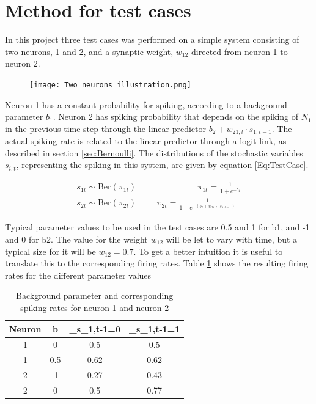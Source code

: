 \section{Method for test cases}
\label{Method}

In this project three test cases was performed on a simple system consisting of two neurons, 1 and 2, and a synaptic weight, $w_{12}$ directed from neuron 1 to neuron 2.

\begin{figure}[h]
    \centering
    \texttt{[image: Two\_neurons\_illustration.png]}
\end{figure}

Neuron 1 has a constant probability for spiking, according to a background parameter $b_1$. Neuron 2 has spiking probability that depends on the spiking of $N_1$ in the previous time step through the linear predictor $b_2 + w_{21,t} \cdot s_{1,t-1}$. The actual spiking rate is related to the linear predictor through a logit link, as described in section \ref{sec:Bernoulli}. The distributions of the stochastic variables $s_{i,t}$, representing the spiking in this system, are given by equation \ref{Eq:TestCase}.

\begin{equation}
\begin{split}
\label{Eq:TestCase}
    s_{1t} \sim \text{Ber}(\pi_{1t}) \hspace{3cm} \pi_{1t}= \frac{1}{1+e^{-b_1}} \\
    s_{2t} \sim \text{Ber}(\pi_{2t}) \hspace{1cm} \pi_{2t}= \frac{1}{1+e^{-(b_2 + w_{21,t} \cdot s_{1,t-1})}}
\end{split}
\end{equation}

Typical parameter values to be used in the test cases are 0.5 and 1 for b1, and -1 and 0 for b2. The value for the weight $w_{12}$ will be let to vary with time, but a typical size for it will be $w_{12}=0.7$. To get a better intuition it is useful to translate this to the corresponding firing rates. Table \ref{table:parameters} shows the resulting firing rates for the different parameter values


\begin{table}[!h]
\centering
\begin{tabular}{|c|c|c|c|}
	\hline
	Neuron & b & \pi_{s_{1,t-1}=0} & \pi_{s_{1,t-1}=1} \\
	\hline\hline
	1 & 0 & 0.5 & 0.5\\
	\hline
	1 & 0.5 & 0.62 & 0.62\\
	\hline
	2 & -1  & 0.27 & 0.43\\
	\hline
	2 & 0  & 0.5 & 0.77\\
	\hline
\end{tabular}
\caption{Background parameter and corresponding spiking rates for neuron 1 and neuron 2}
\label{table:parameters}
\end{table}

